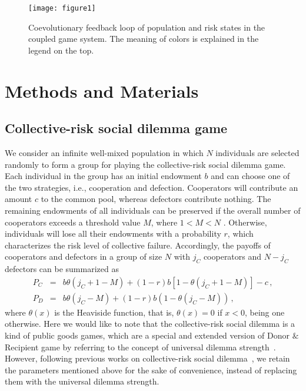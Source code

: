 \documentclass[9pt]{elife}
\begin{document}
\begin{figure}[h!]
\texttt{[image: figure1]}
\caption{Coevolutionary feedback loop of population and risk states in the coupled game system. The meaning of colors is explained in the legend on the top.}
\label{fig1}
\end{figure}

\section{Methods and Materials}

\subsection{Collective-risk social dilemma game}
We consider an infinite well-mixed population in which $N$ individuals are selected randomly to form a group for playing the collective-risk social dilemma game. Each individual in the group has an initial endowment $b$ and can choose one of the two strategies, i.e., cooperation and defection. Cooperators will contribute an amount $c$ to the common pool, whereas defectors contribute nothing. The remaining endowments of all individuals can be preserved if the overall number of cooperators exceeds a threshold value $M$, where $1<M<N$ \citep{milinski2008collective,santos2011risk}. Otherwise, individuals will lose all their endowments with a probability $r$, which characterizes the risk level of collective failure. Accordingly, the payoffs of cooperators and defectors in a group of size $N$ with $j_{C}$ cooperators and $N-j_{C}$ defectors can be summarized as
\begin{eqnarray}
P_{C}&=&b\theta(j_{C}+1-M)+(1-r)b[1-\theta(j_{C}+1-M)]-c\,,\label{1}\\
P_{D}&=&b\theta(j_{C}-M)+(1-r)b(1-\theta(j_{C}-M))\,,\label{2}
\end{eqnarray}
where $\theta(x)$ is the Heaviside function, that is, $\theta(x)=0$ if $x < 0$, being one otherwise. Here we would like to note that the collective-risk social dilemma is a kind of public goods games, which are a special and extended version of Donor $\&$ Recipient game by referring to the concept of universal dilemma strength~\citep{wang2015universal,ito2018scaling,tanimoto2021sociophysics}. However, following previous works on collective-risk social dilemma~\cite{santos2011risk}, we retain the parameters mentioned above for the sake of convenience, instead of
replacing them with the universal dilemma strength.
\end{document}
